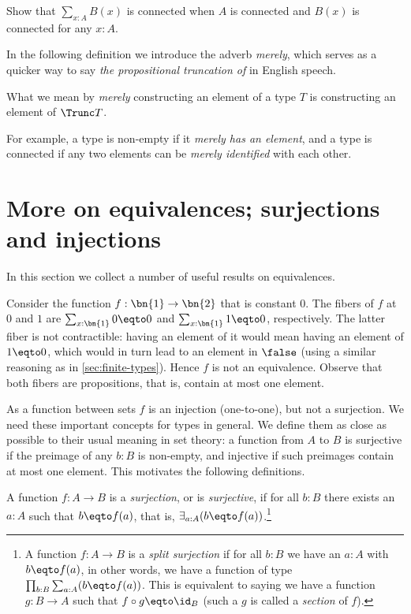 \begin{xca}\label{xca:connected-trivia-1}
  Show that $\sum_{x:A}B(x)$ is connected when $A$ is connected
  and $B(x)$ is connected for any $x:A$.
\end{xca}

In the following definition we introduce the adverb \emph{merely}, which serves as a quicker way to say \emph{the propositional truncation of}
in English speech.

\begin{definition}\label{def:merely}
  What we mean by \emph{merely} constructing an element of a type $T$ is constructing an element of $\Trunc T$.
\end{definition}

For example, a type is non-empty if it \emph{merely has an element}, and a type is connected if any two elements can be
\emph{merely identified} with each other.


\section{More on equivalences; surjections and injections}
\label{sec:more-on-equivalences}

In this section we collect a number of useful results on equivalences.

Consider the function $f:\bn{1}\to\bn{2}$ that is constant $0$.
The fibers of $f$ at $0$ and $1$ are $\sum_{x:\bn{1}} 0\eqto 0$
and $\sum_{x:\bn{1}} 1\eqto 0$, respectively.
The latter fiber is not contractible: having an element
of it would mean having an element of $1\eqto 0$,
which would in turn lead to an element in $\false$
(using a similar reasoning as in \cref{sec:finite-types}).
Hence $f$ is not an equivalence.
Observe that both fibers are propositions,
that is, contain at most one element.

As a function between sets
$f$ is an injection (one-to-one), but not a surjection.
We need these important concepts for types in general.
We define them as close as possible to their
usual meaning in set theory: a function from $A$ to $B$ is
surjective if the preimage of any $b:B$ is non-empty,
and injective if such preimages contain at most one element.
This motivates the following definitions.

\begin{definition}\label{def:surjection}
A function $f:A\to B$ is a \emph{surjection}, or is \emph{surjective},
if for all $b:B$ there exists an $a:A$ such that $b \eqto f(a)$,
that is, $\exists_{a:A} (b \eqto f(a))$.\footnote{%
  A function $f:A\to B$ is a \emph{split surjection}
  if for all $b:B$ we have an $a:A$ with $b \eqto f(a)$,
  in other words, we have a function of type
  $\prod_{b:B} \sum_{a:A} (b \eqto f(a))$.
  This is equivalent to saying we have a function
  $g:B\to A$ such that $f\circ g \eqto \id_B$
  (such a $g$ is called a \emph{section} of $f$).}
\end{definition}

